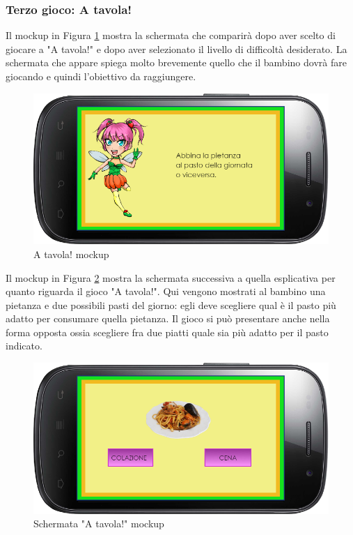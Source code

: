 \subsubsection{Terzo gioco: A tavola!}
Il mockup in Figura \ref{fig:A tavola!} mostra la schermata che comparirà dopo aver scelto di giocare a "A tavola!" e dopo aver selezionato il livello di difficoltà desiderato. La schermata che appare spiega molto brevemente quello che il bambino dovrà fare giocando e quindi l'obiettivo da raggiungere.
\vspace{70pt}
\begin{figure}[htbp]
\centering
\includegraphics[width=\textwidth]{Images/Mockup/gioco3}
\caption{A tavola! mockup}
\label{fig:A tavola!}
\end{figure}
\clearpage

Il mockup in Figura \ref{fig:Schermata "A tavola!"} mostra la schermata successiva a quella esplicativa per quanto riguarda il gioco "A tavola!". Qui vengono mostrati al bambino una pietanza e due possibili pasti del giorno: egli deve scegliere qual è il pasto più adatto per consumare quella pietanza. Il gioco si può presentare anche nella forma opposta ossia scegliere fra due piatti quale sia più adatto per il pasto indicato.
\vspace{70pt}
\begin{figure}[htbp]
\centering
\includegraphics[width=\textwidth]{Images/Mockup/atavola}
\caption{Schermata "A tavola!" mockup}
\label{fig:Schermata "A tavola!"}
\end{figure}
\clearpage


